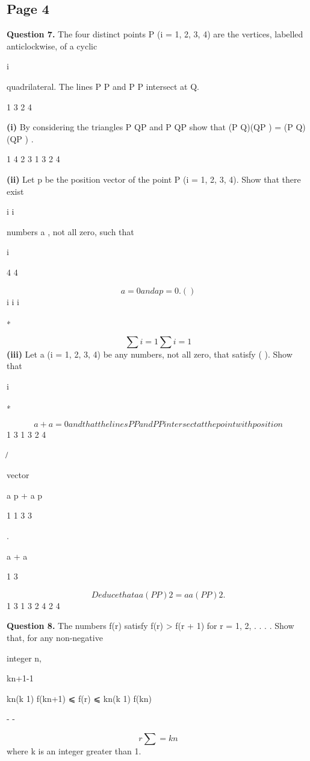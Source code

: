 \documentclass[12pt]{article}
\begin{document}
\subsection*{Page 4}
\begin{flushleft}
\bigskip\textbf{Question 7.} The four distinct points P (i = 1, 2, 3, 4) are the vertices, labelled anticlockwise, of a cyclic\par
i\par
quadrilateral. The lines P P and P P intersect at Q.\par
1 3 2 4\par
\textbf{(i)} By considering the triangles P QP and P QP show that (P Q)(QP ) = (P Q)(QP ) .\par
1 4 2 3 1 3 2 4\par
\textbf{(ii)} Let p be the position vector of the point P (i = 1, 2, 3, 4). Show that there exist\par
i i\par
numbers a , not all zero, such that\par
i\par
4 4\par
\[a = 0 and a p = 0 . ( )\]
i i i\par
∗\par
\[∑i=1 ∑i=1\]
\textbf{(iii)} Let a (i = 1, 2, 3, 4) be any numbers, not all zero, that satisfy ( ). Show that\par
i\par
∗\par
\[a + a = 0 and that the lines P P and P P intersect at the point with position\]
1 3 1 3 2 4\par
̸\par
vector\par
a p + a p\par
1 1 3 3\par
.\par
a + a\par
1 3\par
\[Deduce that a a (P P )2 = a a (P P )2 .\]
1 3 1 3 2 4 2 4\par
\bigskip\textbf{Question 8.} The numbers f(r) satisfy f(r) > f(r + 1) for r = 1, 2, . . . . Show that, for any non-negative\par
integer n,\par
kn+1-1\par
kn(k 1) f(kn+1) ⩽ f(r) ⩽ kn(k 1) f(kn)\par
- -\par
\[r∑=kn\]
where k is an integer greater than 1.\par

\end{flushleft}
\end{document}
